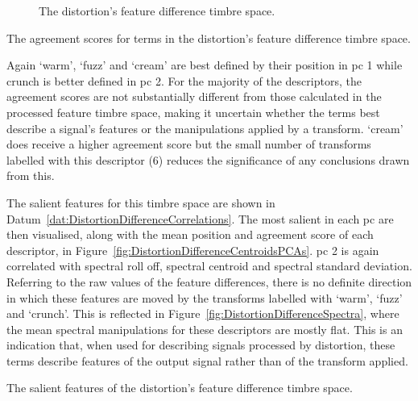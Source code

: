 \begin{figure}[h!]
{					\label{fig:DistortionDifferencePCA3-2}
				}
				\caption{The distortion's feature difference timbre space.}
				\label{fig:DistortionDifferencePCAs}
			\end{figure}

			\begin{table}[h!]
				\centering
				
				\centering
				\caption{The agreement scores for terms in the 
					 distortion's feature difference timbre space.}
				\label{tab:DistortionDifferenceAgreements}
			\end{table}

			Again `warm', `fuzz' and `cream' are best defined by their position in \acrshort{pc} 1 while crunch
			is better defined in \acrshort{pc} 2. For the majority of the descriptors, the agreement scores are
			not substantially different from those calculated in the processed feature timbre space, making it
			uncertain whether the terms best describe a signal's features or the manipulations applied by a
			transform. `cream' does receive a higher agreement score but the small number of transforms
			labelled with this descriptor (6) reduces the significance of any conclusions drawn from this.

			The salient features for this timbre space are shown in
			Datum~\ref{dat:DistortionDifferenceCorrelations}. The most salient in each \acrshort{pc} are then
			visualised, along with the mean position and agreement score of each descriptor, in
			Figure~\ref{fig:DistortionDifferenceCentroidsPCAs}. \acrshort{pc} 2 is again correlated with
			spectral roll off, spectral centroid and spectral standard deviation.  Referring to the raw values
			of the feature differences, there is no definite direction in which these features are moved by the
			transforms labelled with `warm', `fuzz' and `crunch'. This is reflected in
			Figure~\ref{fig:DistortionDifferenceSpectra}, where the mean spectral manipulations for these
			descriptors are mostly flat. This is an indication that, when used for describing signals processed
			by distortion, these terms describe features of the output signal rather than of the transform
			applied.

			\begin{datum}[h!]
				\centering
				\begin{minipage}{0.9\textwidth}
					
				\end{minipage}
				\caption{The salient features of the distortion's
					 feature difference timbre space.}
				\label{dat:DistortionDifferenceCorrelations}
			\end{datum}

